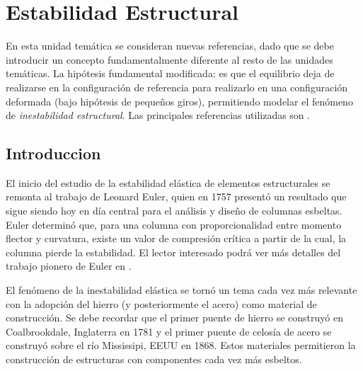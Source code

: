 %
%
%

\chapter{Estabilidad Estructural}

En esta unidad temática se consideran nuevas referencias, dado que se debe introducir un concepto fundamentalmente diferente al resto de las unidades temáticas. %
%
La hipótesis fundamental modificada: es que el equilibrio deja de realizarse en la configuración de referencia para realizarlo en una configuración deformada (bajo hipótesis de pequeños giros), permitiendo modelar el fenómeno de \textit{inestabilidad estructural}. %
%
Las principales referencias utilizadas son \citep{yoo2011,Bazzano2017}.

\section{Introduccion} 

El inicio del estudio de la estabilidad elástica de elementos estructurales se remonta al trabajo de Leonard Euler, quien en 1757 presentó un resultado que sigue siendo hoy en día central para el análisis y diseño de columnas esbeltas. %
%
Euler determinó que, para una columna con proporcionalidad entre momento flector y curvatura, existe un valor de compresión crítica a partir de la cual, la columna pierde la estabilidad. %
%
El lector interesado podrá ver más detalles del trabajo pionero de Euler en \citep{Timoshenko1953}.

El fenómeno de la inestabilidad elástica se tornó un tema cada vez más relevante con la adopción del hierro (y posteriormente el acero) como material de construcción. %
%
Se debe recordar que el primer puente de hierro se construyó en Coalbrookdale, Inglaterra en 1781 y el primer puente de celosía de acero se construyó sobre el río Mississipi, EEUU en 1868.  Estos materiales permitieron la construcción de estructuras con componentes cada vez más esbeltos. 

